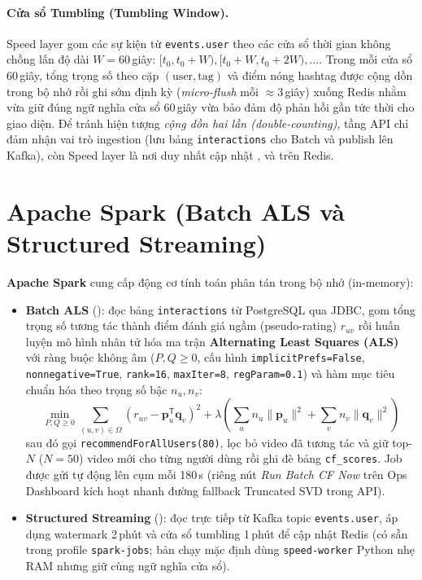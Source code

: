 \paragraph{Cửa sổ Tumbling (Tumbling Window).}
Speed layer gom các sự kiện từ \texttt{events.user} theo các cửa sổ thời gian không chồng lấn độ dài $W = 60$\,giây: $[t_0, t_0+W), [t_0+W, t_0+2W), \dots$. Trong mỗi cửa sổ 60\,giây, tổng trọng số theo cặp $(\text{user}, \text{tag})$ và điểm nóng hashtag được cộng dồn trong bộ nhớ rồi ghi sớm định kỳ (\textit{micro-flush} mỗi $\approx 3$\,giây) xuống Redis nhằm vừa giữ đúng ngữ nghĩa cửa sổ 60\,giây vừa bảo đảm độ phản hồi gần tức thời cho giao diện. Để tránh hiện tượng \emph{cộng dồn hai lần (double-counting)}, tầng API chỉ đảm nhận vai trò ingestion (lưu bảng \texttt{interactions} cho Batch và publish lên Kafka), còn Speed layer là nơi duy nhất cập nhật ,  và  trên Redis.

\section{Apache Spark (Batch ALS và Structured Streaming)}

\textbf{Apache Spark} cung cấp động cơ tính toán phân tán trong bộ nhớ (in-memory):

\begin{itemize}
  \item \textbf{Batch ALS} (): đọc bảng \texttt{interactions} từ PostgreSQL qua JDBC, gom tổng trọng số tương tác thành điểm đánh giá ngầm (pseudo-rating) $r_{uv}$ rồi huấn luyện mô hình nhân tử hóa ma trận \textbf{Alternating Least Squares (ALS)} với ràng buộc không âm ($P, Q \ge 0$, cấu hình \texttt{implicitPrefs=False}, \texttt{nonnegative=True}, \texttt{rank=16}, \texttt{maxIter=8}, \texttt{regParam=0.1}) và hàm mục tiêu chuẩn hóa theo trọng số bậc $n_u, n_v$:
  \begin{equation}
    \min_{P,Q \ge 0} \sum_{(u,v)\in\Omega} \left(r_{uv} - \mathbf{p}_u^{\mathsf T}\mathbf{q}_v\right)^2
    + \lambda \left(\sum_u n_u \|\mathbf{p}_u\|^2 + \sum_v n_v \|\mathbf{q}_v\|^2\right)
  \end{equation}
  sau đó gọi \texttt{recommendForAllUsers(80)}, lọc bỏ video đã tương tác và giữ top-$N$ ($N=50$) video mới cho từng người dùng rồi ghi đè bảng \texttt{cf\_scores}. Job được  gửi tự động lên cụm  mỗi 180\,s (riêng nút \textit{Run Batch CF Now} trên Ops Dashboard kích hoạt nhanh đường fallback Truncated SVD trong API).
  \item \textbf{Structured Streaming} (): đọc trực tiếp từ Kafka topic \texttt{events.user}, áp dụng watermark 2\,phút và cửa sổ tumbling 1\,phút để cập nhật Redis (có sẵn trong profile \texttt{spark-jobs}; bản chạy mặc định dùng \texttt{speed-worker} Python nhẹ RAM nhưng giữ cùng ngữ nghĩa cửa sổ).
\end{itemize}

